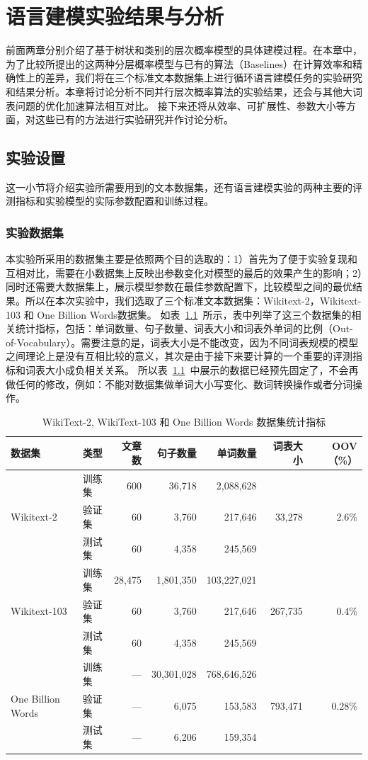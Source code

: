 
\chapter{语言建模实验结果与分析}
前面两章分别介绍了基于树状和类别的层次概率模型的具体建模过程。在本章中，为了比较所提出的这两种分层概率模型与已有的算法（Baselines）在计算效率和精确性上的差异，我们将在三个标准文本数据集上进行循环语言建模任务的实验研究和结果分析。本章将讨论分析不同并行层次概率算法的实验结果，还会与其他大词表问题的优化加速算法相互对比。 接下来还将从效率、可扩展性、参数大小等方面，对这些已有的方法进行实验研究并作讨论分析。

\section{实验设置}
这一小节将介绍实验所需要用到的文本数据集，还有语言建模实验的两种主要的评测指标和实验模型的实际参数配置和训练过程。
\subsection{实验数据集}
本实验所采用的数据集主要是依照两个目的选取的：1）首先为了便于实验复现和互相对比，需要在小数据集上反映出参数变化对模型的最后的效果产生的影响；2）同时还需要大数据集上，展示模型参数在最佳参数配置下，比较模型之间的最优结果。所以在本次实验中，我们选取了三个标准文本数据集：Wikitext-2，Wikitext-103 和 One Billion Words数据集。
如表~\ref{tab:dataset}~所示，表中列举了这三个数据集的相关统计指标，包括：单词数量、句子数量、词表大小和词表外单词的比例（Out-of-Vocabulary）。需要注意的是，词表大小是不能改变，因为不同词表规模的模型之间理论上是没有互相比较的意义，其次是由于接下来要计算的一个重要的评测指标和词表大小成负相关关系。
所以表~\ref{tab:dataset}~中展示的数据已经预先固定了，不会再做任何的修改，例如：不能对数据集做单词大小写变化、数词转换操作或者分词操作。
\begin{table}[!ht]
  \centering
  \caption{WikiText-2, WikiText-103 和 One Billion Words 数据集统计指标 \label{tab:dataset}}
\begin{tabular}{llrrrrr}
\toprule
数据集& 类型& 文章数 & 句子数量 &  单词数量 &词表大小 & OOV （\%） \\ \midrule
\multirow{3}{*}{Wikitext-2} &训练集& 600 & 36,718 & 2,088,628 & \multirow{3}{*}{33,278} & \multirow{3}{*}{2.6\%} \\
&验证集& 60 &3,760 & 217,646  & &\\
&测试集& 60 & 4,358 & 245,569 & &\\
\midrule
\multirow{3}{*}{Wikitext-103} &训练集& 28,475 &  1,801,350 &  103,227,021 & \multirow{3}{*}{267,735} & \multirow{3}{*}{0.4\%} \\
&验证集& 60 &3,760 & 217,646  & &\\
&测试集& 60 & 4,358 & 245,569 & &\\
\midrule
\multirow{3}{*}{One Billion Words} &训练集& --- &30,301,028&768,646,526&   \multirow{3}{*}{793,471} &   \multirow{3}{*}{0.28\%} \\
 &验证集& --- &  6,075 &   153,583 &&\\
 &测试集 & --- &  6,206 &   159,354 &&\\
\bottomrule
\end{tabular}
\end{table}

